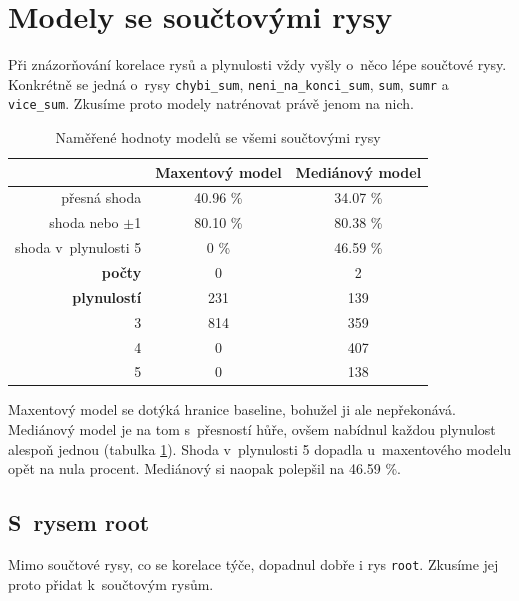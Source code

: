 \documentclass[12pt,a4paper]{report}
\begin{document}
\section{Modely se součtovými rysy}
Při znázorňování korelace rysů a plynulosti vždy vyšly o~něco lépe součtové rysy. Konkrétně se jedná o~rysy \texttt{chybi\_sum}, \texttt{neni\_na\_konci\_sum}, \texttt{sum}, \texttt{sumr} a \texttt{vice\_sum}. Zkusíme proto modely natrénovat právě jenom na nich. 


\pagebreak


\begin{table}[!htbp]
\begin{center}
\begin{tabular}{|r|c|c|}
\hline
 & \textbf{Maxentový model} & \textbf{Mediánový model} \\
 \hline
přesná shoda & 40.96 \%  & 34.07 \%  \\
\hline
shoda nebo $\pm$1 & 80.10 \% & 80.38 \%  \\
\hline
shoda v~plynulosti 5 & \color{red}0 \% & 46.59 \%  \\
\hline
     \textbf{počty} \quad 1 & \color{red}0   & 2   \\
\textbf{plynulostí} \quad 2 & 231 & 139   \\
                          3 & 814 & 359 \\
                          4 & \color{red}0   & 407 \\
                          5 & \color{red}0   & 138  \\
\hline
\end{tabular}
\caption{Naměřené hodnoty modelů se všemi součtovými rysy}\label{tb:allsums}
\end{center}
\end{table}

Maxentový model se dotýká hranice baseline, bohužel ji ale nepřekonává. Mediánový model je na tom s~přesností hůře, ovšem nabídnul každou plynulost alespoň jednou (tabulka \ref{tb:allsums}). Shoda v~plynulosti 5 dopadla u~maxentového modelu opět na nula procent. Mediánový si naopak polepšil na 46.59 \%.

\subsection{S~rysem root}
Mimo součtové rysy, co se korelace týče, dopadnul dobře i rys \texttt{root}. Zkusíme jej proto přidat k~součtovým rysům.
\end{document}
